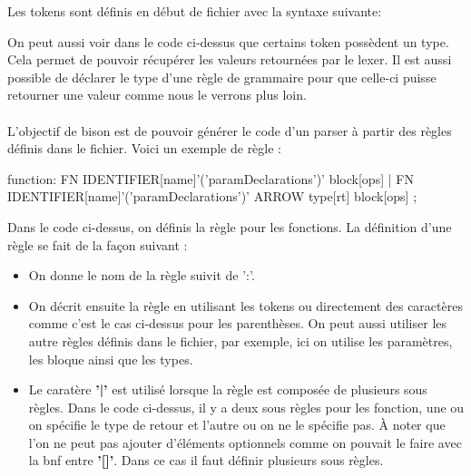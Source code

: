 \documentclass[a4paper]{article}%
\begin{document}
Les tokens sont définis en début de fichier avec la syntaxe suivante:

\begin{code}
\end{code}\leavevmode\newline


On peut aussi voir dans le code ci-dessus que certains token possèdent un type.
Cela permet de pouvoir récupérer les valeurs retournées par le \gls{lexer}. Il est
aussi possible de déclarer le type d'une règle de grammaire pour que celle-ci
puisse retourner une valeur comme nous le verrons plus loin.\\~\\


L'objectif de bison est de pouvoir générer le code d'un \gls{parser} à partir des
règles définis dans le fichier. Voici un exemple de règle :

\begin{code}[language=c++]
function:
        FN IDENTIFIER[name]'('paramDeclarations')' block[ops]
        |
        FN IDENTIFIER[name]'('paramDeclarations')' ARROW type[rt] block[ops]
        ;
\end{code}\leavevmode\newline

Dans le code ci-dessus, on définis la règle pour les fonctions. La définition
d'une règle se fait de la façon suivant :

\begin{itemize}
  \item On donne le nom de la règle suivit de ':'.
  \item On décrit ensuite la règle en utilisant les tokens ou directement des
    caractères comme c'est le cas ci-dessus pour les parenthèses. On peut aussi
    utiliser les autre règles définis dans le fichier, par exemple, ici on
    utilise les paramètres, les bloque ainsi que les types.
  \item Le caratère \textbf{'|'} est utilisé lorsque la règle est composée de
    plusieurs sous règles. Dans le code ci-dessus, il y a deux sous règles pour
    les fonction, une ou on spécifie le type de retour et l'autre ou on ne le
    spécifie pas. À noter que l'on ne peut pas ajouter d'éléments optionnels
    comme on pouvait le faire avec la \gls{bnf} entre \textbf{'[]'}. Dans ce cas
    il faut définir plusieurs sous règles.
\end{itemize}~\\
\end{document}
